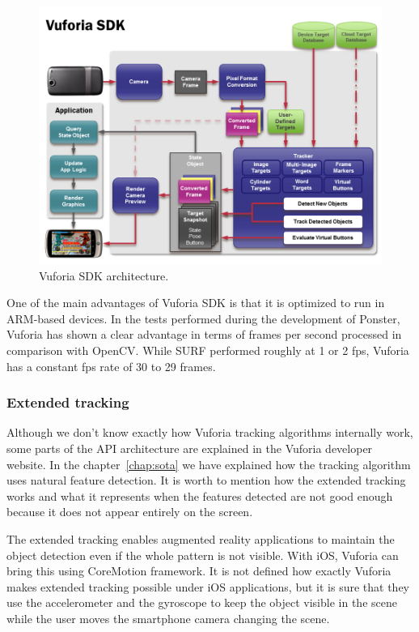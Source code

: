 \begin{figure}
\centering
\includegraphics[scale=0.45]{img/vuforiasdk.png}
\caption{\label{fig:vuforiasdk}Vuforia SDK architecture.}
\end{figure} 

One of the main advantages of Vuforia SDK is that it is optimized to run in
ARM-based devices. In the tests performed during the development of Ponster, Vuforia
has shown a clear advantage in terms of frames per second processed in comparison
with OpenCV. While SURF performed roughly at 1 or 2 fps, Vuforia has a constant fps
rate of 30 to 29 frames.

\subsubsection{Extended tracking}
Although we don't know exactly how Vuforia tracking algorithms internally work, some
parts of the API architecture are explained in the Vuforia developer website. In the
chapter~\ref{chap:sota} we have explained how the tracking algorithm uses natural
feature detection. It is worth to mention how the extended tracking works and what
it represents when the features detected are not good enough because it does not
appear entirely on the screen.

The extended tracking enables augmented reality applications to maintain the object
detection even if the whole pattern is not visible. With iOS, Vuforia can bring this
using CoreMotion framework. It is not defined how exactly Vuforia makes extended
tracking possible under iOS applications, but it is sure that they use the
accelerometer and the gyroscope to keep the object visible in the scene while the
user moves the smartphone camera changing the scene.


